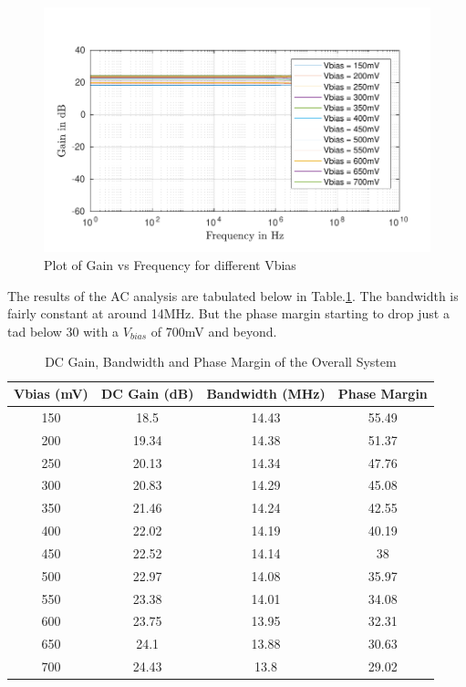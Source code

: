 \begin{figure} [H]
\centering
\includegraphics[scale=1]{Figures/Plots/Ov_Gain.pdf}
\caption{Plot of Gain vs Frequency for different Vbias}
\label{fig:Gain}
\end{figure}
The results of the AC analysis are tabulated below in Table.\ref{tab:GAIN_GBW_PM}. The bandwidth is fairly constant at around 14MHz. But the phase margin starting to drop just a tad below 30 with a $V_{bias}$ of 700mV and beyond. 
\begin{table} [H]
\centering
\begin{tabular}{@{}cccc@{}}
\toprule
Vbias (mV)			& DC Gain (dB) 	& Bandwidth (MHz) 	& Phase Margin \\ \midrule
150					& 18.5  		& 14.43 			& 55.49 \\
200					& 19.34			& 14.38 			& 51.37 \\
250					& 20.13  		& 14.34 			& 47.76 \\
300					& 20.83	 		& 14.29 			& 45.08 \\
350					& 21.46			& 14.24 			& 42.55 \\
400					& 22.02	 		& 14.19 			& 40.19 \\
450					& 22.52 		& 14.14 			& 38	\\
500					& 22.97 		& 14.08 			& 35.97	\\
550					& 23.38 		& 14.01 			& 34.08 \\
600					& 23.75 		& 13.95 			& 32.31 \\
650					& 24.1 			& 13.88 			& 30.63 \\
700 				& 24.43 		& 13.8  			& 29.02 \\
\bottomrule
\end{tabular}
\caption{DC Gain, Bandwidth and Phase Margin of the Overall System}
\label{tab:GAIN_GBW_PM}
\end{table}

